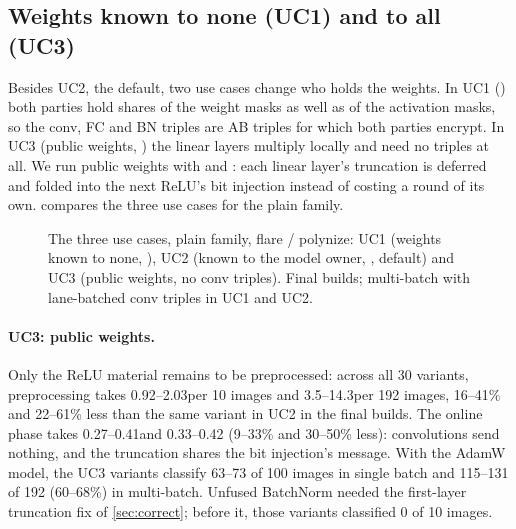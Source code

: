 \subsection{Weights known to none (UC1) and to all (UC3)}\label{sec:kpw}

Besides UC2, the default, two use cases change who holds the weights. In UC1 () both parties hold
shares of the weight masks as well as of the activation masks, so the conv, FC and BN triples are AB triples for
which both parties encrypt. In UC3 (public weights, ) the linear layers multiply locally
and need no triples at all. We run public weights with  and
: each linear layer's truncation is deferred and folded into the next
ReLU's bit injection instead of costing a round of its own.  compares the three use cases for
the plain family.

\begin{figure}[t]
  \centering
  \caption{The three use cases, plain family, flare / polynize: UC1 (weights known to none, ), UC2
  (known to the model owner, , default) and UC3 (public weights, no conv triples). Final builds;
  multi-batch with lane-batched conv triples in UC1 and UC2.}
  \label{fig:settings}
\end{figure}

\paragraph{UC3: public weights.} Only the ReLU material remains to be preprocessed: across all 30 variants,
preprocessing takes 0.92--2.03\s per 10 images and 3.5--14.3\s per 192 images, 16--41\% and 22--61\%
less than the same variant in UC2 in the final builds. The online phase takes 0.27--0.41\s and 0.33--0.42\s
(9--33\% and 30--50\% less): convolutions send nothing, and the truncation shares the bit injection's message. With the AdamW model, the UC3 variants
classify 63--73 of 100 images in single batch and 115--131 of 192 (60--68\%) in multi-batch. Unfused
BatchNorm needed the first-layer truncation fix of \cref{sec:correct}; before it, those variants classified 0 of 10 images.


